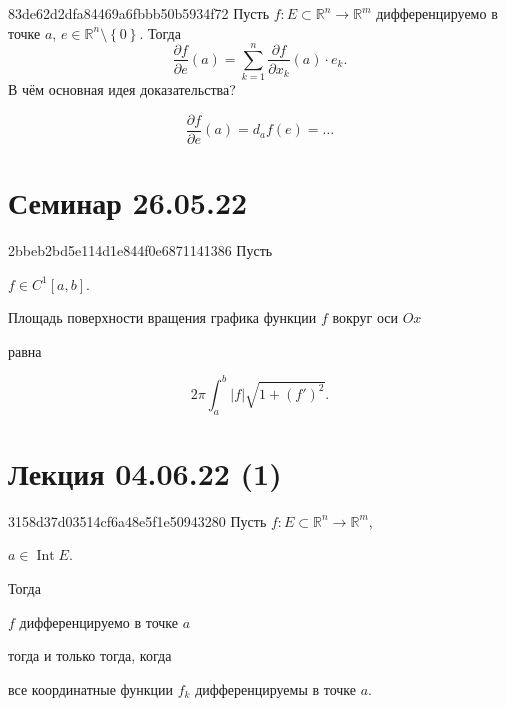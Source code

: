 \begin{note}{83de62d2dfa84469a6fbbb50b5934f72}
    Пусть \({ f : E \subset \mathbb R^{n} \to \mathbb R^{m} }\) дифференцируемо в точке \({ a }\),\: \({ e \in \mathbb R^{n} \setminus \left\{ 0 \right\} }\).
    Тогда
    \[
        \frac{\partial f}{\partial e}(a) = \sum_{k=1}^{n} \frac{\partial f}{\partial x_k}(a) \cdot e_k.
    \]
    В чём основная идея доказательства?

    \begin{cloze}{1}
        \[
            \frac{\partial f}{\partial e}(a) = d_{a}f(e) = \ldots
        \]
    \end{cloze}
\end{note}

\section{Семинар 26.05.22}
\begin{note}{2bbeb2bd5e114d1e844f0e6871141386}
    Пусть \begin{icloze}{3}\({ f \in C^{1}[a, b] }\).\end{icloze} \begin{icloze}{2}Площадь поверхности вращения графика функции \({ f }\) вокруг оси \({ Ox }\)\end{icloze} равна
    \begin{icloze}{1}
        \[
            2\pi \int_{a}^{b} \left\lvert f \right\rvert \sqrt{1 + \left( f' \right)^2}.
        \]
    \end{icloze}
\end{note}

\section{Лекция 04.06.22 (1)}
\begin{note}{3158d37d03514cf6a48e5f1e50943280}
    Пусть \({ f : E \subset \mathbb R^{n} \to \mathbb R^{m} }\),\: \begin{icloze}{4}\({ a \in \operatorname{Int} E }\).\end{icloze}
    Тогда \begin{icloze}{2}\({ f }\) дифференцируемо в точке \({ a }\)\end{icloze} \begin{icloze}{3}тогда и только тогда, когда\end{icloze} \begin{icloze}{1}все координатные функции \({ f_k }\) дифференцируемы в точке \({ a }\).\end{icloze}
\end{note}

